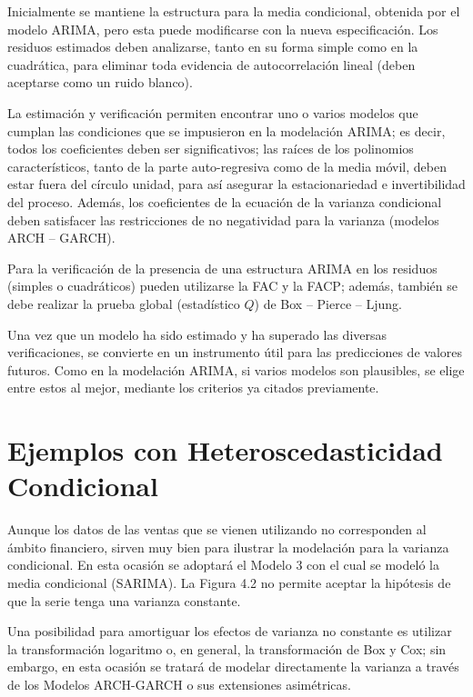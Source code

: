 Inicialmente se mantiene la estructura para la media condicional, obtenida por el modelo ARIMA, pero esta puede modificarse con la nueva especificaci\'{o}n. Los residuos estimados deben analizarse, tanto en su forma simple como en la cuadr\'{a}tica, para eliminar toda evidencia de autocorrelaci\'{o}n lineal (deben aceptarse como un ruido blanco).\newline

La estimaci\'{o}n y verificaci\'{o}n permiten encontrar uno o varios modelos que cumplan las condiciones que se impusieron en la modelaci\'{o}n ARIMA; es decir, todos los coeficientes deben ser significativos; las ra\'{i}ces de los polinomios caracter\'{i}sticos, tanto de la parte auto-regresiva como de la media m\'{o}vil, deben estar fuera del c\'{i}rculo unidad, para as\'{i} asegurar la estacionariedad e invertibilidad del proceso. Adem\'{a}s, los coeficientes de la ecuaci\'{o}n de la varianza condicional deben satisfacer las restricciones de no negatividad para la varianza (modelos ARCH -- GARCH).\newline

Para la verificaci\'{o}n de la presencia de una estructura ARIMA en los residuos (simples o cuadr\'{a}ticos) pueden utilizarse la FAC y la FACP; adem\'{a}s, tambi\'{e}n se debe realizar la prueba global (estad\'{i}stico $Q$) de Box -- Pierce -- Ljung.\newline

Una vez que un modelo ha sido estimado y ha superado las diversas verificaciones, se convierte en un instrumento \'{u}til para las predicciones de valores futuros. Como en la modelaci\'{o}n ARIMA, si varios modelos son plausibles, se elige entre estos al mejor, mediante los criterios ya citados previamente.

\section{Ejemplos con Heteroscedasticidad Condicional}

Aunque los datos de las ventas que se vienen utilizando no corresponden al \'{a}mbito financiero, sirven muy bien para ilustrar la modelaci\'{o}n para la varianza condicional. En esta ocasi\'{o}n se adoptar\'{a} el Modelo 3 con el cual se model\'{o} la media condicional (SARIMA). La Figura 4.2 no permite aceptar la hip\'{o}tesis de que la serie tenga una varianza constante.\newline

Una posibilidad para amortiguar los efectos de varianza no constante es utilizar la transformaci\'{o}n logaritmo o, en general, la transformaci\'{o}n de Box y Cox; sin embargo, en esta ocasi\'{o}n se tratar\'{a} de modelar directamente la varianza a trav\'{e}s de los Modelos ARCH-GARCH o sus extensiones asim\'{e}tricas.\newline

